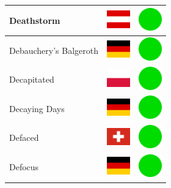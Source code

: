\documentclass[12pt, a4paper, twoside]{report}
\begin{document}
\begin{center}
\begin{longtable}{|p{5cm}|p{2cm}|p{2cm}|}
			Deathstorm & \includegraphics[width=1cm]{4x3/at} & \includegraphics[width=1cm]{likes/y} \\ \hline
			Debauchery's Balgeroth & \includegraphics[width=1cm]{4x3/de} & \includegraphics[width=1cm]{likes/y} \\ \hline
			Decapitated & \includegraphics[width=1cm]{4x3/pl} & \includegraphics[width=1cm]{likes/y} \\ \hline
			Decaying Days & \includegraphics[width=1cm]{4x3/de} & \includegraphics[width=1cm]{likes/y} \\ \hline
			Defaced & \includegraphics[width=1cm]{4x3/ch} & \includegraphics[width=1cm]{likes/y} \\ \hline
			Defocus & \includegraphics[width=1cm]{4x3/de} & \includegraphics[width=1cm]{likes/y} \\ \hline

\end{longtable}
\end{center}
\end{document}
